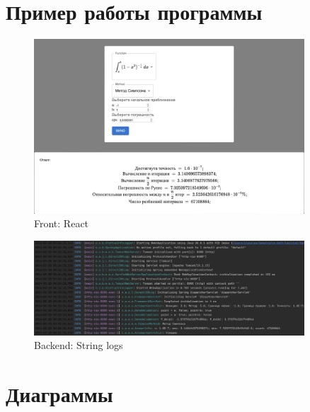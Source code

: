 \documentclass{article}
\begin{document}
\section{Пример работы программы}
\begin{figure}[H]
    \centering
    \includegraphics[width=0.9\textwidth]{example.png}
    \caption{Front: React}
    \label{fig:example}
\end{figure}

\begin{figure}[H]
    \centering
    \includegraphics[width=0.9\textwidth]{logs.png}
    \caption{Backend: String logs}
    \label{fig:logs}
\end{figure}

\section{Диаграммы}
\end{document}
